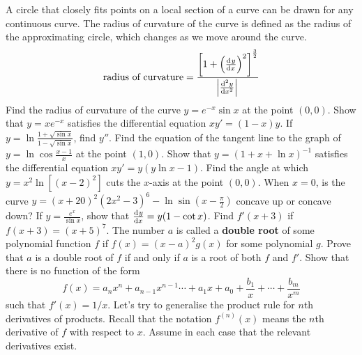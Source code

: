 \begin{questions}
  \questioE A circle that closely fits points on a local section of a curve can be drawn for any continuous curve. The
            radius of curvature of the curve is defined as the radius of the approximating circle, which changes as
            we move around the curve.
            \begin{displaymath}
              \textrm{radius of curvature} = \frac{\left[1 +  \left(\od{y}{x}\right)^2 \right]^{\frac{3}{2}}}{\abs{\od[2]{y}{x}}}
            \end{displaymath}
            Find the radius of curvature of the curve $ y = e^{-x} \sin x $ at the point $ (0, 0) $.
  \questioM Show that $ y = xe^{-x} $ satisfies the differential equation $ xy' = (1-x)y $.
  \questioM If $ y = \ln \frac{1 + \sqrt{\sin x}}{1 - \sqrt{\sin x}} $, find $ y'' $.
  \questioM Find the equation of the tangent line to the graph of $ y = \ln \cos \frac{x - 1}{x} $ at
            the point $(1, 0)$.
  \questioM Show that $ y = (1 + x + \ln x)^{-1} $ satisfies the differential equation $ xy' = y(y \ln x - 1) $.
  \questioE Find the angle at which $ y = x^2 \ln [(x - 2)^2] $ cuts the $ x$-axis at the point $ (0,0) $.
  \questioM When $ x = 0 $, is the curve $ y = (x + 20)^2 (2x^2 - 3)^6 - \ln \sin (x - \frac{\pi}{2}) $ concave up or concave down?
  \questioM If $ y = \frac{e^x}{\sin x} $, show that $ \od{y}{x} = y(1 - \cot x) $.
  \questioE Find $ f'(x + 3) $ if $ f(x + 3) = (x + 5)^7 $.
  \questioE The number $ a $ is called a \textbf{double root} of some polynomial function $ f $ if $ f(x) = (x - a)^2g(x) $ for
            some polynomial $ g $. Prove that $ a $ is a double root of $ f $ if and only if $ a $ is a root of both $ f $ and $ f' $.
  \questioE Show that there is no function of the form
            \begin{displaymath}
              f(x) = a_n x^n + a_{n - 1} x^{n - 1} \cdots + a_1 x + a_0 + \frac{b_1}{x} + \cdots + \frac{b_m}{x^m}
            \end{displaymath}
            such that $ f'(x) = 1/x $.
  \questioS Let's try to generalise the product rule for $ n$th derivatives of products. Recall that the notation $ f^{(n)}(x) $ means the $ n$th derivative
            of $ f $ with respect to $ x $. Assume in each case that the relevant derivatives exist.
    \begin{parts}

\end{parts}
\end{questions}
